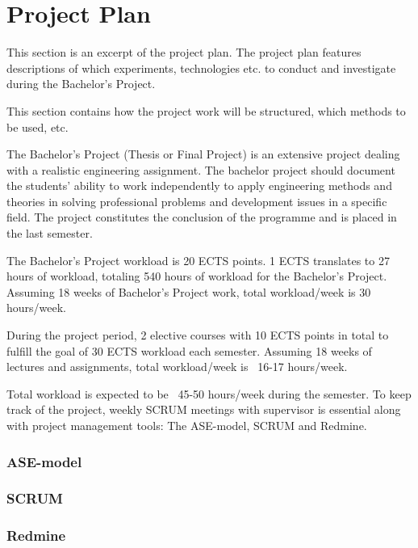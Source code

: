 \chapter{Project Plan}
This section is an excerpt of the project plan. The project plan features descriptions of which experiments, technologies etc. to conduct and investigate during the Bachelor's Project. \newline

This section contains how the project work will be structured, which methods to be used, etc. \newline

The Bachelor’s Project (Thesis or Final Project) is an extensive project dealing with a realistic engineering assignment. The bachelor project should document the students’ ability to work independently to apply engineering methods and theories in solving professional problems and development issues in a specific field. The project constitutes the conclusion of the programme and is placed in the last semester. \newline

The Bachelor's Project workload is 20 ECTS points. 1 ECTS translates to 27 hours of workload, totaling 540 hours of workload for the Bachelor's Project. Assuming 18 weeks of Bachelor's Project work, total workload/week is 30 hours/week. \newline

During the project period, 2 elective courses with 10 ECTS points in total to fulfill the goal of 30 ECTS workload each semester. Assuming 18 weeks of lectures and assignments, total workload/week is ~16-17 hours/week. \newline

Total workload is expected to be ~45-50 hours/week during the semester. To keep track of the project, weekly SCRUM meetings with supervisor is essential along with project management tools: The ASE-model, SCRUM and Redmine. \newline

\subsection{ASE-model}


\subsection{SCRUM}


\subsection{Redmine}


